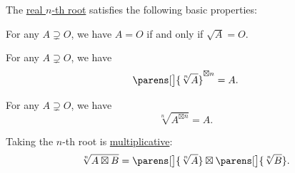 \begin{proposition}\label{thm:def:principal_nonnegative_nth_root}
  The \hyperref[def:principal_nonnegative_nth_root]{real \( n \)-th root} satisfies the following basic properties:
  \begin{thmenum}
     For any \( A \supsetneq O \), we have \( A = O \) if and only if \( \sqrt A = O \).

     For any \( A \supsetneq O \), we have
    \begin{equation}\label{eq:thm:def:principal_nonnegative_nth_root/power_of_root}
      \parens[\big]{ \sqrt[n]{ A } }^{\boxtimes n} = A.
    \end{equation}

     For any \( A \supsetneq O \), we have
    \begin{equation}\label{eq:thm:def:principal_nonnegative_nth_root/root_of_power}
      \sqrt[n]{ A^{\boxtimes n} } = A.
    \end{equation}

     Taking the \( n \)-th root is \hyperref[def:multiplicative_function]{multiplicative}:
    \begin{equation}\label{eq:thm:def:principal_nonnegative_nth_root/multiplicative}
      \sqrt[n]{ A \boxtimes B } = \parens[\big]{\sqrt[n]{ A }} \boxtimes \parens[\big]{\sqrt[n]{ B }}.
    \end{equation}
  \end{thmenum}
\end{proposition}

